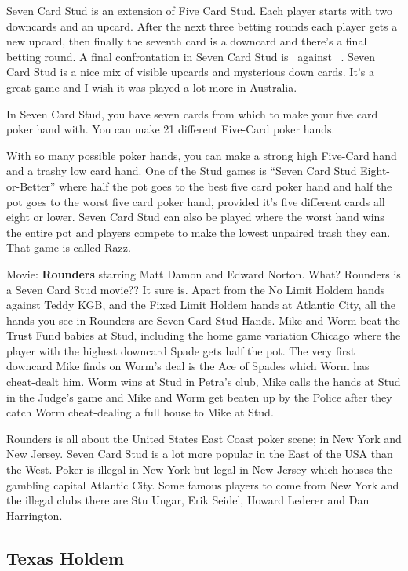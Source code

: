 Seven Card Stud is an extension of Five Card Stud. Each player starts
with two downcards and an upcard. After the next three betting rounds
each player gets a new upcard, then finally the seventh card is a
downcard and there's a final betting round. A final confrontation in
Seven Card Stud is \back\back\nines\Qd\Jd\tred\back\ against
\back\back\fourh\Jh\tend\trec\back\ . Seven Card Stud is a nice mix of
visible upcards and mysterious down cards. It's a great game and I
wish it was played a lot more in Australia.

In Seven Card Stud, you have seven cards from which to make your five
card poker hand with. You can make 21 different Five-Card poker
hands.

With so many possible poker hands, you can make a strong high
Five-Card hand and a trashy low card hand. One of the Stud games is
``Seven Card Stud Eight-or-Better'' where half the pot goes to the
best five card poker hand and half the pot goes to the worst five card
poker hand, provided it's five different cards all eight or lower.
Seven Card Stud can also be played where the worst hand wins the
entire pot and players compete to make the lowest unpaired trash they
can. That game is called Razz.

Movie: \textbf{Rounders} starring Matt Damon and Edward Norton.
What? Rounders is a Seven Card Stud movie?? It sure is. Apart from the
No Limit Holdem hands against Teddy KGB, and the Fixed Limit Holdem
hands at Atlantic City, all the hands you see in Rounders are Seven
Card Stud Hands. Mike and Worm beat the Trust Fund babies at Stud,
including the home game variation Chicago where the player with the
highest downcard Spade gets half the pot. The very first downcard Mike
finds on Worm's deal is the Ace of Spades which Worm has cheat-dealt him.
Worm wins at Stud in Petra's club, Mike calls the hands at Stud in
the Judge's game and Mike and Worm get beaten up by the Police after
they catch Worm cheat-dealing a full house to Mike at Stud.

Rounders is all about the United States East Coast poker scene;
in New York and New Jersey. Seven Card Stud is a lot more
popular in the East of the USA than the West. Poker is illegal in
New York but legal in New Jersey which houses the gambling capital
Atlantic City. Some famous players to come from New York and the illegal
clubs there are Stu Ungar, Erik Seidel, Howard Lederer and Dan Harrington.

\subsection{Texas Holdem}

